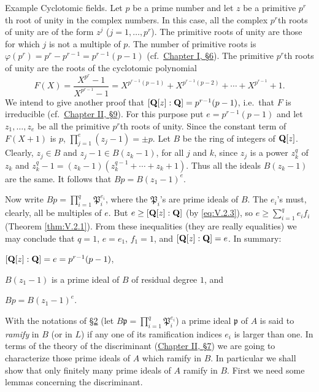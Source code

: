 \begin{statement}{Example}
Cyclotomic fields. Let $p$ be a prime number and let $z$ be a
primitive $p^{r}$th root of unity in the complex numbers. In this case, all
the complex $p^{r}$th roots of unity are of the form $z^{j}$
($j=1,\ldots,p^{r}$). The primitive roots of unity are those for which $j$
is not a multiple of $p$. The number of primitive roots is
$\varphi(p^{r})=p^{r}-p^{r-1}=p^{r-1}(p-1)$ (cf.\ \hyperref[sec:1.6]{Chapter I, §6}). The
primitive $p^{r}$th roots of unity are the roots of the cyclotomic
polynomial
\begin{equation}
F(X)=\frac{X^{p^{r}}-1}{X^{p^{r-1}}-1}
=X^{p^{r-1}(p-1)}+X^{p^{r-1}(p-2)}+\cdots+X^{p^{r-1}}+1.
\label{eq:V.2.3}
\end{equation}
We intend to give another proof that $[\mathbf{Q}[z]:\mathbf{Q}]=p^{r-1}(p-1)$, i.e.\ that
$F$ is irreducible (cf.\ \hyperref[sec:2.9]{Chapter II, §9}). For this purpose put
$e=p^{r-1}(p-1)$ and let $z_{1},\ldots,z_{e}$ be all the primitive
$p^{r}$th roots of unity. Since the constant term of $F(X+1)$ is $p$,
$\prod_{j=1}^{e}(z_{j}-1)=\pm p$. Let $B$ be the ring of integers of
$\mathbf{Q}[z]$. Clearly, $z_{j}\in B$ and
$z_{j}-1\in B(z_{k}-1)$, for all $j$ and $k$, since $z_{j}$ is a power
$z_{k}^{q}$ of $z_{k}$ and
$z_{k}^{q}-1=(z_{k}-1)(z_{k}^{q-1}+\cdots+z_{k}+1)$. Thus all the ideals
$B(z_{k}-1)$ are the same. It follows that $Bp=B(z_{1}-1)^{e}$.

Now write $Bp=\prod_{i=1}^{q}\mathfrak{P}_{i}^{e_{i}}$, where the
$\mathfrak{P}_{i}$'s are prime ideals of $B$. The $e_{i}$'s must, clearly,
all be multiples of $e$. But $e\geq[\mathbf{Q}[z]:\mathbf{Q}]$ (by \eqref{eq:V.2.3}), so
$e\geq\sum_{i=1}^{q}e_{i}f_{i}$ (Theorem \ref{thm:V.2.1}). From these
inequalities (they are really equalities) we may conclude that $q=1$,
$e=e_{1}$, $f_{1}=1$, and $[\mathbf{Q}[z]:\mathbf{Q}]=e$. In summary:
\begin{alist}
\item $[\mathbf{Q}[z]:\mathbf{Q}]=e=p^{r-1}(p-1)$,
\item $B(z_{1}-1)$ is a prime ideal of $B$ of residual degree $1$, and
\item $Bp=B(z_{1}-1)^{e}$.
\end{alist}
\end{statement}


With the notations of \hyperref[sec:5.2]{§2} (let
$B\mathfrak{p}=\prod_{i=1}^{q}\mathfrak{P}_{i}^{e_{i}}$) a prime ideal
$\mathfrak{p}$ of $A$ is said to \emph{ramify} in $B$ (or in $L$) if any one
of its ramification indices $e_{i}$ is larger than one. In terms of the
theory of the discriminant (\hyperref[sec:2.7]{Chapter II, §7}) we are going to characterize
those prime ideals of $A$ which ramify in $B$. In particular we shall show
that only finitely many prime ideals of $A$ ramify in $B$. First we need
some lemmas concerning the discriminant.

